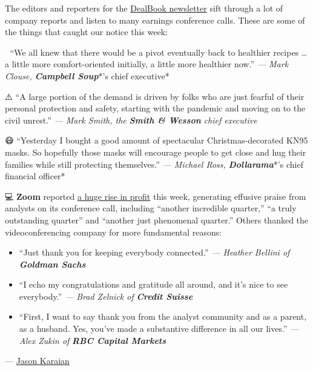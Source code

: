The editors and reporters for the
\href{https://www.nytimes3xbfgragh.onion/2020/09/04/business/dealbook/stock-markets-tech.html}{DealBook
newsletter} sift through a lot of company reports and listen to many
earnings conference calls. These are some of the things that caught our
notice this week:

🥫 ``We all knew that there would be a pivot eventually back to healthier
recipes \ldots{} a little more comfort-oriented initially, a little more
healthier now.'' \emph{--- Mark Clouse,} \emph{\textbf{Campbell
Soup}}*'s chief executive*

⚠️ ``A large portion of the demand is driven by folks who are just
fearful of their personal protection and safety, starting with the
pandemic and moving on to the civil unrest.'' \emph{--- Mark Smith, the}
\emph{\textbf{Smith \& Wesson}} \emph{chief executive}

😷 ``Yesterday I bought a good amount of spectacular Christmas-decorated
KN95 masks. So hopefully those masks will encourage people to get close
and hug their families while still protecting themselves.'' \emph{---
Michael Ross,} \emph{\textbf{Dollarama}}*'s chief financial officer*

💻 \textbf{Zoom} reported
\href{https://www.cnbc.com/2020/09/01/zooms-stock-surges-41percent-on-earnings-adding-over-37-billion-in-value.html}{a
huge rise in profit} this week, generating effusive praise from analysts
on its conference call, including ``another incredible quarter,'' ``a
truly outstanding quarter'' and ``another just phenomenal quarter.''
Others thanked the videoconferencing company for more fundamental
reasons:

\begin{itemize}
\item
  ``Just thank you for keeping everybody connected.'' \emph{--- Heather
  Bellini of} \emph{\textbf{Goldman Sachs}}
\item
  ``I echo my congratulations and gratitude all around, and it's nice to
  see everybody.'' \emph{--- Brad Zelnick of} \emph{\textbf{Credit
  Suisse}}
\item
  ``First, I want to say thank you from the analyst community and as a
  parent, as a husband. Yes, you've made a substantive difference in all
  our lives.'' \emph{--- Alex Zukin of} \emph{\textbf{RBC Capital
  Markets}}
\end{itemize}

--- \href{https://www.nytimes3xbfgragh.onion/by/jason-karaian}{Jason
Karaian}

